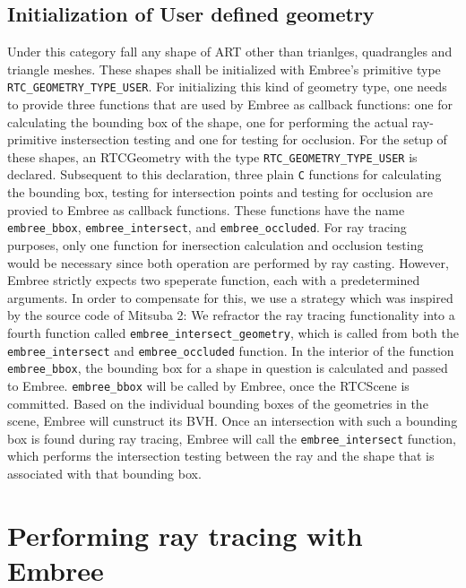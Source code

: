 \subsection{Initialization of User defined geometry}
Under this category fall any shape of ART other than trianlges, quadrangles and triangle meshes. These shapes shall be initialized with Embree's primitive type \texttt{RTC\_GEOMETRY\_TYPE\_USER}. For initializing this kind of geometry type, one needs to provide three functions that are used by Embree as callback functions: one for calculating the bounding box of the shape, one for performing the actual ray-primitive instersection testing and one for testing for occlusion. For the setup of these shapes, an RTCGeometry with the type \texttt{RTC\_GEOMETRY\_TYPE\_USER} is declared. Subsequent to this declaration, three plain \texttt{C} functions for calculating the bounding box, testing for intersection points and testing for occlusion are provied to Embree as callback functions.
These functions have the name \texttt{embree\_bbox}, \texttt{embree\_intersect}, and \texttt{embree\_occluded}. For ray tracing purposes, only one function for inersection calculation and occlusion testing would be necessary since both operation are performed by ray casting. However, Embree strictly expects two speperate function, each with a predetermined arguments. In order to compensate for this, we use a strategy which was inspired by the source code of Mitsuba 2: We refractor the ray tracing functionality into a fourth function called \texttt{embree\_intersect\_geometry}, which is called from both the \texttt{embree\_intersect} and \texttt{embree\_occluded} function. 
In the interior of the function \texttt{embree\_bbox}, the bounding box for a shape in question is calculated and passed to Embree. \texttt{embree\_bbox} will be called by Embree, once the RTCScene is committed. Based on the individual bounding boxes of the geometries in the scene, Embree will cunstruct its BVH. Once an intersection with such a bounding box is found during ray tracing, Embree will call the \texttt{embree\_intersect} function, which performs the intersection testing between the ray and the shape that is associated with that bounding box.



\section{Performing ray tracing with Embree}
\label{sec:embree_raycasting}


